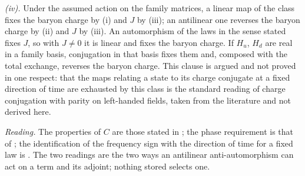 \emph{(iv).} Under the assumed action on the family matrices, a linear map of the class fixes the baryon charge by (i) and $J$ by (iii); an antilinear one reverses the baryon charge by (ii) and $J$ by (iii). An automorphism of the laws in the sense stated fixes $J$, so with $J \neq 0$ it is linear and fixes the baryon charge. If $H_{u}$, $H_{d}$ are real in a family basis, conjugation in that basis fixes them and, composed with the total exchange, reverses the baryon charge. This clause is argued and not proved in one respect: that the maps relating a state to its charge conjugate at a fixed direction of time are exhausted by this class is the standard reading of charge conjugation with parity on left-handed fields, taken from the literature and not derived here.

\emph{Reading.} The properties of $C$ are those stated in ; the phase requirement is that of ; the identification of the frequency sign with the direction of time for a fixed law is . The two readings are the two ways an antilinear anti-automorphism can act on a term and its adjoint; nothing stored selects one.
